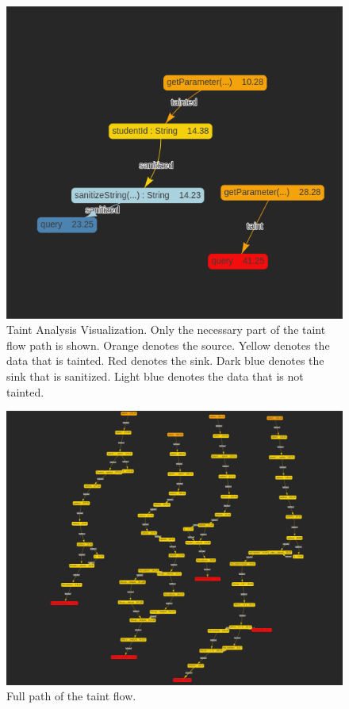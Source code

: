 \documentclass[sigplan,10pt,review]{acmart}
\begin{document}
\begin{figure}[h]
  \centering
  \includegraphics[width=\linewidth]{taint_part}
  \caption{Taint Analysis Visualization. Only the necessary part of the taint flow path is shown. Orange denotes the source. Yellow denotes the data that is tainted. Red denotes the sink. Dark blue denotes the sink that is sanitized. Light blue denotes the data that is not tainted.}
\end{figure}

\begin{figure}[h]
  \centering
  \includegraphics[width=\linewidth]{taint_full}
  \caption{Full path of the taint flow. }
\end{figure}
\end{document}
